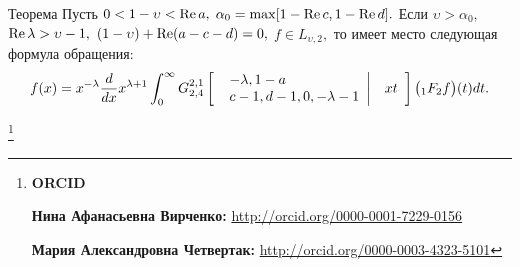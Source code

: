 \smallskip

\begin{newthm}{Теорема} 
Пусть $0<1-\upsilon <\mathop{\rm Re} a,$ $\alpha _0 =\max [ 1-\mathop{\rm Re} c, 1-\mathop{\rm Re} d ].$ 
Если 
$\upsilon >\alpha _0 ,$ $\mathop{\rm Re} \lambda >\upsilon -1,$ 
$( 1-\upsilon )+ \mathop{\rm Re} (a-c-d)=0,$ $f\in L_{\upsilon ,2} ,$ то имеет место следующая формула обращения{\/\rm:} 
\begin{equation}
\label{vir:eq16}
f( x )=x^{-\lambda }\frac{d}{dx}x^{\lambda +1}
\int_0^\infty G_{2,4}^{2,1} 
\left[ \begin{array}{*{20}c}
 {\left. \begin{array}{*{20}c}
 {-\lambda , 1-a} \hfill \\
 {c-1, d-1, 0, -\lambda -1} \hfill \\
\end{array}  \right|} \hfill & {xt} \hfill \\
\end{array}  \right] \bigl( { }_1F_2 f \bigr) ( t )dt.
\end{equation}

\end{newthm}


\thanks{{\bf ORCID}

{\bf Нина Афанасьевна Вирченко:} \url{http://orcid.org/0000-0001-7229-0156}

{\bf Мария Александровна Четвертак:} \url{http://orcid.org/0000-0003-4323-5101}

}


\RusRef

